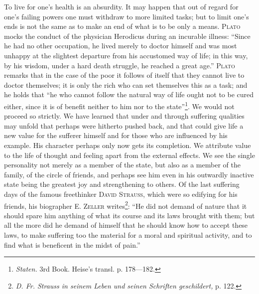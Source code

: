 \documentclass[12pt,a4paper,openany]{book}
\newcommand{\opage}[1]{\marginnote{\footnotesize\textit{[#1]}}}
\begin{document}
To live for one's health is an absurdity. It may happen that out of regard for one's failing powers one must
withdraw to more limited tasks; but to limit one's ends is not the same as to make an end of what is to be only a
means. \textsc{Plato} mocks the conduct of the physician Herodicus during an incurable illness: ``Since he had no
other occupation, he lived merely to doctor himself and was most unhappy at the slightest departure from his
accustomed way of life; in this way, by his wisdom, under a hard death struggle, he reached a great age.''
\textsc{Plato} remarks that in the case of the poor it follows of itself that they cannot live to doctor
themselves; it is only the rich who can set themselves this as a task; and he holds that ``he who cannot follow
the natural way of life ought not to be cured either, since it is of benefit neither to him nor to the
state''\footnote[1]{\textit{Staten.} 3rd Book. Heise's transl. p. 178---182.}. We would not proceed so strictly.
We have learned that under and through suffering qualities may unfold that perhaps were hitherto pushed back, and
that could give life a new value for the sufferer himself and for those who are influenced by his example. His
character perhaps only now gets its completion. We attribute value to the life of thought and feeling apart
from the external effects. We see the single personality not merely as a member of the state, but also as a
member of the family, of the circle of friends, and perhaps see him even in his outwardly inactive state being
the greatest joy and strengthening to others. Of the last suffering days of the famous freethinker \textsc{David Strauss}, which were so edifying for his friends, his biographer E. \textsc{Zeller}
writes\footnote[2]{\textit{D. Fr. Strauss in seinem Leben und seinen Schriften geschildert,} p.
122.}: ``He did not demand of nature that it
\opage{210}should spare him anything of what its course and its laws brought with them; but all the more did he
demand of himself that he should know how to accept these laws, to make suffering too the material for a moral
and spiritual activity, and to find what is beneficent in the midst of pain.''
\end{document}
